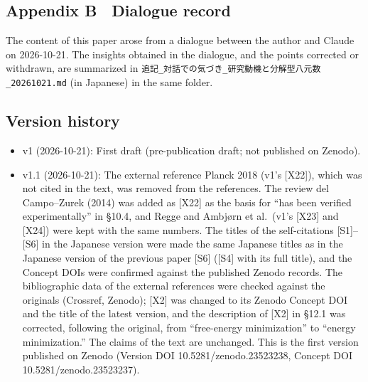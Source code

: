 \documentclass[
  a4paper,
]{article}
\providecommand{\tightlist}{%
  \setlength{\itemsep}{0pt}\setlength{\parskip}{0pt}}
\begin{document}
\subsection{Appendix B　Dialogue
record}\label{appendix-b-dialogue-record}

The content of this paper arose from a dialogue between the author and
Claude on 2026-10-21. The insights obtained in the dialogue, and the
points corrected or withdrawn, are summarized in
\texttt{追記\_\allowbreak{}対話での気づき\_\allowbreak{}研究動機と分解型八元数\_\allowbreak{}20261021.md} (in
Japanese) in the same folder.

\subsection{Version history}\label{version-history}

\begin{itemize}
\tightlist
\item
  v1 (2026-10-21): First draft (pre-publication draft; not published on
  Zenodo).
\item
  v1.1 (2026-10-21): The external reference Planck 2018 (v1's
  {[}X22{]}), which was not cited in the text, was removed from the
  references. The review del Campo--Zurek (2014) was added as {[}X22{]}
  as the basis for ``has been verified experimentally'' in §10.4, and
  Regge and Ambjørn et al.~(v1's {[}X23{]} and {[}X24{]}) were kept with
  the same numbers. The titles of the self-citations {[}S1{]}--{[}S6{]}
  in the Japanese version were made the same Japanese titles as in the
  Japanese version of the previous paper {[}S6{]} ({[}S4{]} with its
  full title), and the Concept DOIs were confirmed against the published
  Zenodo records. The bibliographic data of the external references were
  checked against the originals (Crossref, Zenodo); {[}X2{]} was changed
  to its Zenodo Concept DOI and the title of the latest version, and the
  description of {[}X2{]} in §12.1 was corrected, following the
  original, from ``free-energy minimization'' to ``energy
  minimization.'' The claims of the text are unchanged. This is the
  first version published on Zenodo (Version DOI
  10.5281/zenodo.23523238, Concept DOI 10.5281/zenodo.23523237).
\end{itemize}
\end{document}

